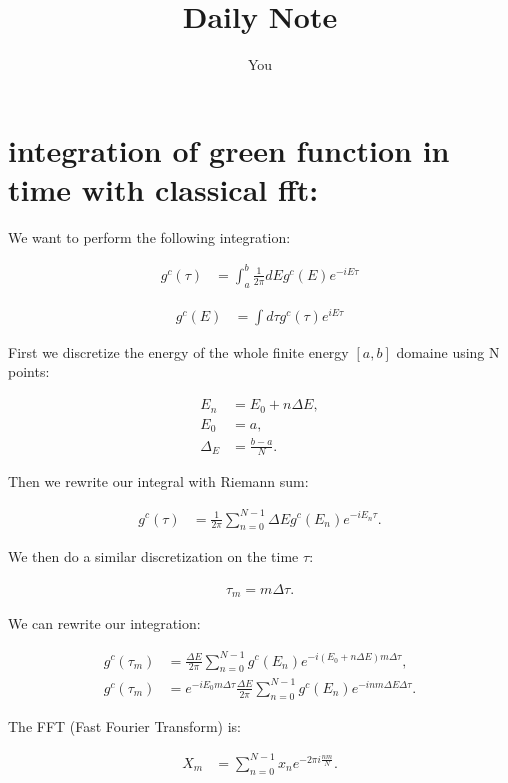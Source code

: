 \documentclass{article}
\title{Daily Note}
\author{You}
\begin{document}
	\maketitle
	
	\section{integration of green function in time with classical fft:}
	
	We want to perform the following integration:
	
	\begin{align}
		g^{c}(\tau) &= \int_a^b \frac{1}{2\pi} dE g^c(E)e^{-iE\tau}
	\end{align}
	
	\begin{align}
		g^{c}(E) &= \int d\tau g^c(\tau)e^{iE\tau}
	\end{align}
	
	First we discretize the energy of the whole finite energy $[a,b]$ domaine using N points:
	
	\begin{align}
		E_n &= E_0 + n\Delta E,\\
		E_0 &= a,\\
		\Delta_E &= \frac{b-a}{N}.
	\end{align}
	
	Then we rewrite our integral with Riemann sum:
	
	\begin{align}
		g^{c}(\tau) &= \frac{1}{2\pi} \sum_{n=0}^{N-1}  \Delta E g^c(E_n)e^{-iE_n\tau}.
	\end{align}
	
	We then do a similar discretization on the time $\tau$:
	
	\begin{align}
		\tau_m = m \Delta \tau.
	\end{align}
	
	We can rewrite our integration:
	
	\begin{align}
		g^{c}(\tau_m) &= \frac{\Delta E}{2\pi} \sum_{n=0}^{N-1}   g^c(E_n)e^{-i(E_0 + n\Delta E)m \Delta \tau},\\
		g^{c}(\tau_m) &= e^{-iE_0m \Delta \tau} \frac{\Delta E}{2\pi} \sum_{n=0}^{N-1} g^c(E_n)e^{-inm\Delta E \Delta \tau}.
	\end{align}
	
	The FFT (Fast Fourier Transform) is:
	
	\begin{align}
		X_m &= \sum_{n=0}^{N-1}x_ne^{-2\pi{}i\frac{n m}{N}}. %
	\end{align}
	
\end{document}
